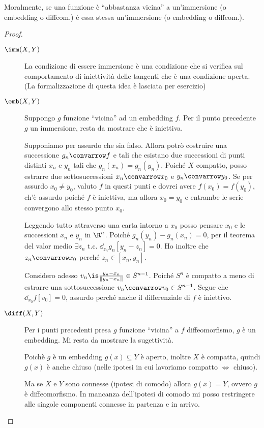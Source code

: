 Moralmente, se una funzione è ``abbastanza vicina'' a un'immersione (o embedding o diffeom.) è essa stessa un'immersione (o embedding o diffeom.).
\begin{proof}
\noindent
\begin{description}
\item [$\imm(X,Y)$] La condizione di essere immersione è una condizione che si verifica sul comportamento di iniettività delle tangenti che è una condizione aperta. (La formalizzazione di questa idea è lasciata per esercizio)
\item [$\emb(X,Y)$] Suppongo $g$ funzione ``vicina'' ad un embedding $f$. Per il punto precedente $g$ un immersione, resta da mostrare che è iniettiva. 

Supponiamo per assurdo che sia falso. Allora potrò costruire una successione $g_n \convarrow f$ e tali che esistano due successioni di punti distinti $x_n$ e $y_n$ tali che $g_n(x_n) = g_n(y_n)$. 
Poiché $X$ compatto, posso estrarre due sottosuccessioni $x_n \convarrow x_0$ e $y_n \convarrow y_0$. Se per assurdo $x_0 \neq y_0$, valuto $f$ in questi punti e dovrei avere $f(x_0)=f(y_0)$, ch'è assurdo poiché $f$ è iniettiva, ma allora $x_0=y_0$ e entrambe le serie convergono allo stesso punto $x_0$.

Leggendo tutto attraverso una carta intorno a $x_0$ posso pensare $x_0$ e le successioni $x_n$ e $y_n$ in $\R^n$.
Poiché $g_n(y_n)-g_n(x_n)=0$, per il teorema del valor medio $\exists z_n \text{ t.c. } \dd_{z_n}g_n[y_n-z_n]=0$.
Ho inoltre che $z_n \convarrow x_0$ perché $z_n \in [x_n,y_n]$.

Considero adesso $v_n \is \frac{y_n-x_n}{\left \|y_n - x_n \right \|} \in S^{n-1}$. Poiché $S^n$ è compatto a meno di estrarre una sottosuccessione $v_n \convarrow v_0 \in S^{n-1}$.
Segue che $\dd_{x_0}f[v_0]=0$,
assurdo perché anche il differenziale di $f$ è iniettivo. \absurd
\item [$\diff(X,Y)$] Per i punti precedenti presa $g$ funzione ``vicina'' a $f$ diffeomorfismo, $g$ è un embedding. Mi resta da mostrare la sugettività.

Poichè $g$ è un embedding $g(x) \subseteq Y$ è aperto, inoltre $X$ è compatta, quindi $g(x)$ è anche chiuso (nelle ipotesi in cui lavoriamo compatto $\iff$ chiuso).

Ma se $X$ e $Y$ sono connesse (ipotesi di comodo) allora $g(x) = Y$, ovvero $g$ è diffeomorfismo. In mancanza dell'ipotesi di comodo mi posso restringere alle singole componenti connesse in partenza e in arrivo.
\qedhere
\end{description}
\end{proof}

